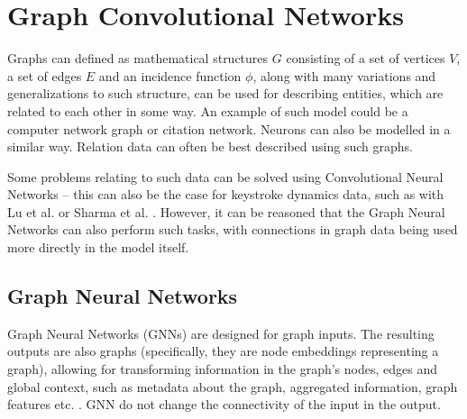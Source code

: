 
\chapter{Graph Convolutional Networks}

Graphs can defined as mathematical structures $G$ consisting of a set of vertices $V$, a set of edges $E$ and an incidence function $\phi$, along with many variations and generalizations to such structure, can be used for describing entities, which are related to each other in some way. An example of such model could be a computer network graph or citation network. Neurons can also be modelled in a similar way. Relation data can often be best described using such graphs. \cite{Lesk2024}

Some problems relating to such data can be solved using Convolutional Neural Networks -- this can also be the case for keystroke dynamics data, such as with Lu et al. \cite{Lu2020} or Sharma et al. \cite{Shar2023}. However, it can be reasoned that the Graph Neural Networks can also perform such tasks, with connections in graph data being used more directly in the model itself.

\section{Graph Neural Networks}
Graph Neural Networks (GNNs) are designed for graph inputs. The resulting outputs are also graphs (specifically, they are node embeddings representing a graph), allowing for transforming information in the graph's nodes, edges and global context, such as metadata about the graph, aggregated information, graph features etc. \cite{sanch2021}. GNN do not change the connectivity of the input in the output. 

